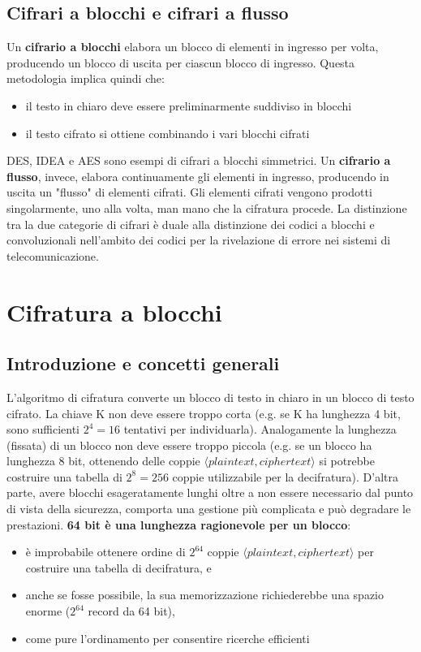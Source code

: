 \subsection{Cifrari a blocchi e cifrari a flusso}
Un \textbf{cifrario a blocchi} elabora un blocco di elementi in ingresso per volta, producendo un blocco di uscita per ciascun blocco di ingresso. Questa metodologia implica quindi che:
\begin{itemize}
  \item il testo in chiaro deve essere preliminarmente suddiviso in blocchi
  \item il testo cifrato si ottiene combinando i vari blocchi cifrati
\end{itemize}
DES, IDEA e AES sono esempi di cifrari a blocchi simmetrici. Un \textbf{cifrario a flusso}, invece, elabora continuamente gli elementi in ingresso, producendo in uscita un "flusso" di elementi cifrati. Gli elementi cifrati vengono prodotti singolarmente, uno alla volta, man mano che la cifratura procede. La distinzione tra la due categorie di cifrari è duale alla distinzione dei codici a blocchi e convoluzionali nell'ambito dei codici per la rivelazione di errore nei sistemi di telecomunicazione.

\section{Cifratura a blocchi}

\subsection{Introduzione e concetti generali}
L’algoritmo di cifratura converte un blocco di testo in chiaro in un blocco di testo cifrato. La chiave K non deve essere troppo corta (e.g. se K ha lunghezza 4 bit, sono sufficienti $2^4 = 16$ tentativi per individuarla). Analogamente la lunghezza (fissata) di un blocco non deve essere troppo piccola (e.g. se un blocco ha lunghezza 8 bit, ottenendo delle coppie $\langle plaintext, ciphertext \rangle$ si potrebbe costruire una tabella di $2^8 = 256$ coppie utilizzabile per la decifratura).\newline 
D'altra parte, avere blocchi esageratamente lunghi oltre a non essere necessario dal punto di vista della sicurezza, comporta una gestione più complicata e può degradare le prestazioni. \textbf{64 bit è una lunghezza ragionevole per un blocco}: 

\begin{itemize}
  \item è improbabile ottenere ordine di $2^{64}$ coppie $\langle plaintext, ciphertext \rangle$ per costruire una tabella di decifratura, e
  \item anche se fosse possibile, la sua memorizzazione richiederebbe una spazio enorme ($2^{64}$ record da 64 bit),
  \item come pure l’ordinamento per consentire ricerche efficienti
\end{itemize}

